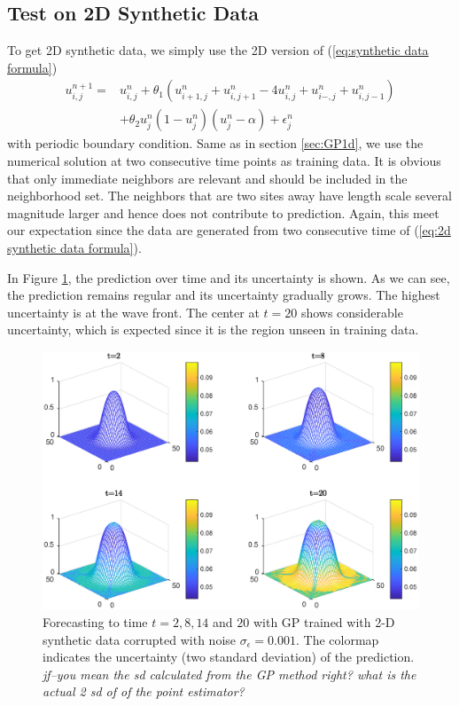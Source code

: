 \documentclass[smallextended,natbib]{svjour3}       %
\begin{document}
\subsection{Test on 2D Synthetic Data}
To get 2D synthetic data, we simply use the 2D version of (\ref{eq:synthetic data formula})
\begin{equation} \label{eq:2d synthetic data formula}
\begin{split}
u_{i,j}^{n+1}  = & u_{i,j}^{n}+\theta_{1}(u_{i+1,j}^{n}+u_{i,j+1}^{n}-4u_{i,j}^{n}+u_{i-,j}^{n}+u_{i,j-1}^{n}) \\
 &+\theta_{2}u_{j}^{n}(1-u_{j}^{n})(u_{j}^{n}-\alpha)+\epsilon_{j}^{n}
\end{split}
\end{equation}
with periodic boundary condition. Same as in section \ref{sec:GP1d}, we use the numerical solution at two consecutive time points as training data.   It is obvious that only immediate neighbors are relevant and should be included in the neighborhood set. The neighbors that are two sites away have length scale several magnitude larger and hence does not contribute to prediction. Again, this meet our expectation since the data are generated from two consecutive time of (\ref{eq:2d synthetic data formula}).     


In Figure \ref{fig:u subplot 2d}, the prediction over time and its uncertainty is shown. As we can see, the prediction remains regular and its uncertainty gradually grows. The highest uncertainty is at the wave front. The center at $t=20$ shows considerable uncertainty, which is expected since it is the region unseen in training data.    

\begin{figure}[h]
\centerline{\includegraphics[width=\textwidth]{chapterGP/figures/2d_u_surf_S_color}}
\caption[Forecasting to Time $t=2,8,14$ and $20$ with GP Trained with 2-D Synthetic Data]{\label{fig:u subplot 2d} Forecasting to time $t=2,8,14$ and $20$ with GP trained with 2-D synthetic data corrupted with noise $\sigma_{\epsilon}=0.001$. The colormap indicates the uncertainty (two standard deviation) of the prediction. \emph{jf--you mean the sd calculated from the GP method right?  what is the actual 2 sd of of the point estimator?}}
\end{figure}
\end{document}
